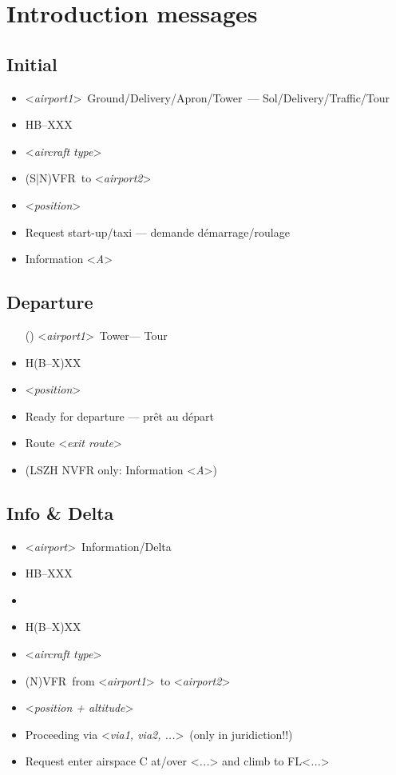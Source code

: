 \documentclass[12pt,twoside,a4paper]{article}
\title{\ThisTitle}
\author{\ThisAuthors}
\date{\today\\[5mm]\normalsize Document version~\DocVersion}
\newcommand*{\Rep}[1]{<\emph{#1}>}
\newcommand*{\Act}[1]{{\color{red}{#1}} }
\newcommand*{\AP}[1][]{\Rep{airport#1}}
\newcommand*{\GND}{Ground}
\newcommand*{\DEL}{Delivery}
\newcommand*{\APR}{Apron}
\newcommand*{\TWR}{Tower}
\newcommand*{\INFO}{Information}
\newcommand*{\DELTA}{Delta}
\newcommand*{\SOL}{Sol}
\newcommand*{\TOR}{Tour}
\newcommand*{\HB}{HB--XXX}
\newcommand*{\ShortHB}{H(B--X)XX}
\newcommand*{\TYPE}{\Rep{aircraft type}}
\newcommand*{\VFR}{VFR}
\newcommand*{\NVFR}{(N)\VFR}
\newcommand*{\SNVFR}{(S|N)\VFR}
\newcommand*{\POS}{\Rep{position}}
\newcommand*{\POSDDD}{\Rep{position + altitude}}
\newcommand*{\InfoA}{\Rep{A}}
\newcommand*{\Via}{\Rep{via1, via2, ...}}
\newcommand*{\WAIT}{\Act{.....wait for answer.....}}
\numberwithin{equation}{section}
\numberwithin{figure}{section}
\begin{document}
\section{Introduction messages}%
\label{sec:introo}
\subsection{Initial}%
\label{sec:intro:init}
\begin{itemize}
	\item \AP[1]\ \GND/\DEL/\APR/\TWR\ --- \SOL/\DEL/Traffic/\TOR
	\item \HB
	\item \TYPE
	\item \SNVFR\ to \AP[2]
	\item \POS
	\item Request start-up/taxi --- demande d\'emarrage/roulage
	\item Information \InfoA
\end{itemize}
\subsection{Departure}%
\label{sec:intro:departure}
\begin{itemize}
	\item[(\textbullet)] \AP[1]\ \TWR --- \TOR
	\item \ShortHB
	\item \POS
	\item Ready for departure --- pr\^et au d\'epart
	\item Route \Rep{exit route}
	\item (LSZH NVFR only: Information \InfoA)
\end{itemize}
\subsection{Info \& Delta}%
\label{sec:intro:InfoDelta}
\begin{itemize}
\renewcommand{\labelitemi}{\bfseries I+D}
	\item \AP\ \INFO/\DELTA
	\item \HB
	\item \WAIT
	\item \ShortHB
	\item \TYPE
	\item \NVFR\ from \AP[1]\ to \AP[2]
	\item \POSDDD
	\item Proceeding via \Via\ (only in juridiction!!)
\renewcommand{\labelitemi}{\bfseries D}
	\item Request enter airspace C at/over \Rep{...} and climb to FL\Rep{...}
\end{itemize}
\end{document}
